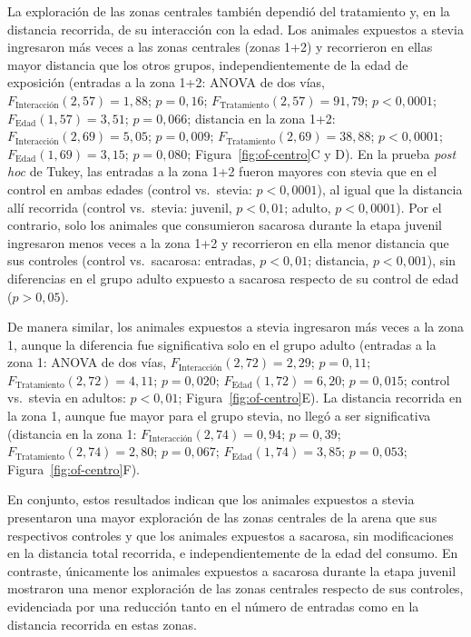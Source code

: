\label{sec:res-of-centro}La exploración de las zonas centrales también dependió del tratamiento y, en la distancia recorrida, de su interacción con la edad. Los animales expuestos a stevia ingresaron más veces a las zonas centrales (zonas 1+2) y recorrieron en ellas mayor distancia que los otros grupos, independientemente de la edad de exposición (entradas a la zona 1+2: ANOVA de dos vías, $F_{\text{Interacción}}(2, 57) = 1{,}88$; $p = 0{,}16$; $F_{\text{Tratamiento}}(2, 57) = 91{,}79$; $p < 0{,}0001$; $F_{\text{Edad}}(1, 57) = 3{,}51$; $p = 0{,}066$; distancia en la zona 1+2: $F_{\text{Interacción}}(2, 69) = 5{,}05$; $p = 0{,}009$; $F_{\text{Tratamiento}}(2, 69) = 38{,}88$; $p < 0{,}0001$; $F_{\text{Edad}}(1, 69) = 3{,}15$; $p = 0{,}080$; Figura~\ref{fig:of-centro}C y D). En la prueba \textit{post hoc} de Tukey, las entradas a la zona 1+2 fueron mayores con stevia que en el control en ambas edades (control vs.\ stevia: $p < 0{,}0001$), al igual que la distancia allí recorrida (control vs.\ stevia: juvenil, $p < 0{,}01$; adulto, $p < 0{,}0001$). Por el contrario, solo los animales que consumieron sacarosa durante la etapa juvenil ingresaron menos veces a la zona 1+2 y recorrieron en ella menor distancia que sus controles (control vs.\ sacarosa: entradas, $p < 0{,}01$; distancia, $p < 0{,}001$), sin diferencias en el grupo adulto expuesto a sacarosa respecto de su control de edad ($p > 0{,}05$).

De manera similar, los animales expuestos a stevia ingresaron más veces a la zona 1, aunque la diferencia fue significativa solo en el grupo adulto (entradas a la zona 1: ANOVA de dos vías, $F_{\text{Interacción}}(2, 72) = 2{,}29$; $p = 0{,}11$; $F_{\text{Tratamiento}}(2, 72) = 4{,}11$; $p = 0{,}020$; $F_{\text{Edad}}(1, 72) = 6{,}20$; $p = 0{,}015$; control vs.\ stevia en adultos: $p < 0{,}01$; Figura~\ref{fig:of-centro}E). La distancia recorrida en la zona 1, aunque fue mayor para el grupo stevia, no llegó a ser significativa (distancia en la zona 1: $F_{\text{Interacción}}(2, 74) = 0{,}94$; $p = 0{,}39$; $F_{\text{Tratamiento}}(2, 74) = 2{,}80$; $p = 0{,}067$; $F_{\text{Edad}}(1, 74) = 3{,}85$; $p = 0{,}053$; Figura~\ref{fig:of-centro}F).

En conjunto, estos resultados indican que los animales expuestos a stevia presentaron una mayor exploración de las zonas centrales de la arena que sus respectivos controles y que los animales expuestos a sacarosa, sin modificaciones en la distancia total recorrida, e independientemente de la edad del consumo. En contraste, únicamente los animales expuestos a sacarosa durante la etapa juvenil mostraron una menor exploración de las zonas centrales respecto de sus controles, evidenciada por una reducción tanto en el número de entradas como en la distancia recorrida en estas zonas.

